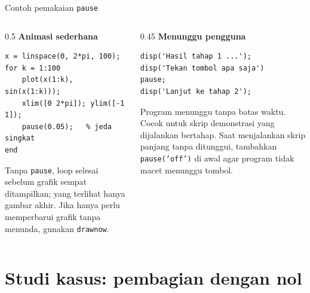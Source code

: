 \documentclass[aspectratio=169,10pt]{beamer}
\newcommand{\kode}[1]{\texttt{#1}}
\begin{document}
\begin{frame}[fragile]{Contoh pemakaian \kode{pause}}
  \begin{columns}[T]
    \begin{column}{0.5\textwidth}
      \textbf{Animasi sederhana}
\begin{lstlisting}
x = linspace(0, 2*pi, 100);
for k = 1:100
    plot(x(1:k), sin(x(1:k)));
    xlim([0 2*pi]); ylim([-1 1]);
    pause(0.05);   % jeda singkat
end
\end{lstlisting}
      \vspace{2pt}
      \footnotesize
      Tanpa \kode{pause}, loop selesai sebelum grafik sempat ditampilkan; yang terlihat hanya gambar akhir.
      Jika hanya perlu memperbarui grafik tanpa menunda, gunakan \kode{drawnow}.
    \end{column}
    \begin{column}{0.45\textwidth}
      \textbf{Menunggu pengguna}
\begin{lstlisting}
disp('Hasil tahap 1 ...');
disp('Tekan tombol apa saja')
pause;
disp('Lanjut ke tahap 2');
\end{lstlisting}
      \vspace{2pt}
      \footnotesize
      Program menunggu tanpa batas waktu. Cocok untuk skrip demonstrasi yang dijalankan bertahap.
      Saat menjalankan skrip panjang tanpa ditunggui, tambahkan \kode{pause('off')} di awal agar
      program tidak macet menunggu tombol.
    \end{column}
  \end{columns}
\end{frame}

\section{Studi kasus: pembagian dengan nol}
\end{document}
